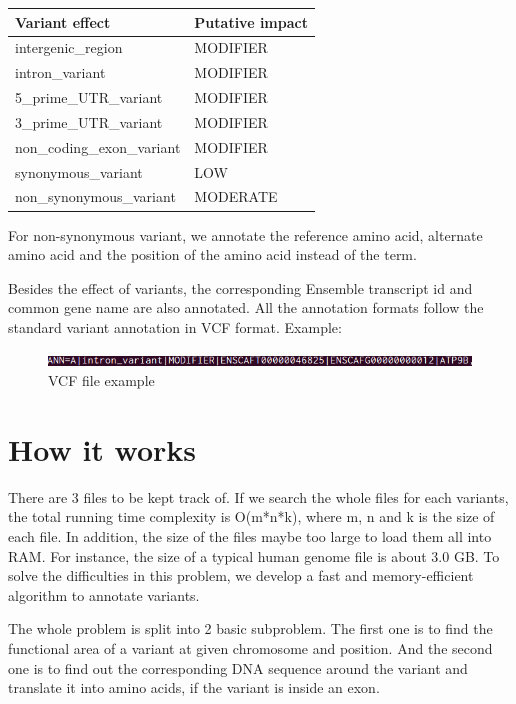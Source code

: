 \documentclass[onehalf,11pt]{beavtex}
\begin{document}
\begin{table}[H]
\centering
\begin{tabular}{l| l}
\hline
Variant effect & Putative impact \\
\hline
  intergenic\_region & MODIFIER \\
  intron\_variant & MODIFIER \\
  5\_prime\_UTR\_variant & MODIFIER \\
  3\_prime\_UTR\_variant & MODIFIER \\
  non\_coding\_exon\_variant & MODIFIER \\
  synonymous\_variant & LOW \\
  non\_synonymous\_variant & MODERATE \\

\end{tabular}
\end{table}

For non-synonymous variant, we annotate the reference amino acid, alternate amino acid and the position of the amino acid instead of the term.

Besides the effect of variants, the corresponding Ensemble transcript id and common gene name are also annotated. All the annotation formats follow the standard variant annotation in VCF format. Example:
\begin{figure}[!ht]
\centering
\includegraphics[scale=0.7]{./pic/ann.png}
\caption{VCF file example}
\end{figure}

\section{How it works}
There are 3 files to be kept track of. If we search the whole files for each variants, the total running time complexity is O(m*n*k), where m, n and k is the size of each file. In addition, the size of the files maybe too large to load them all into RAM. For instance, the size of a typical human genome file is about 3.0 GB. To solve the difficulties in this problem, we develop a fast and memory-efficient algorithm to annotate variants.

The whole problem is split into 2 basic subproblem. The first one is to find the functional area of a variant at given chromosome and position. And the second one is to find out the corresponding DNA sequence around the variant and translate it into amino acids, if the variant is inside an exon.
\end{document}
